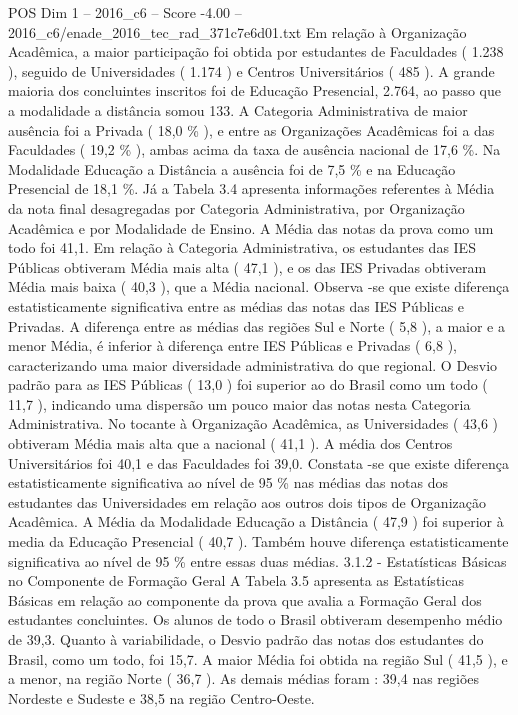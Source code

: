 \begin{textsample}{POS Dim 1 – 2016\_c6 – Score -4.00 – 2016\_c6/enade\_2016\_tec\_rad\_371c7e6d01.txt}
Em relação à Organização Acadêmica, a maior participação foi obtida por estudantes de Faculdades ( 1.238 ), seguido de Universidades ( 1.174 ) e Centros Universitários ( 485 ).
A grande maioria dos concluintes inscritos foi de Educação Presencial, 2.764, ao passo que a modalidade a distância somou 133.
A Categoria Administrativa de maior ausência foi a Privada ( 18,0 \% ), e entre as Organizações Acadêmicas foi a das Faculdades ( 19,2 \% ), ambas acima da taxa de ausência nacional de 17,6 \%.
Na Modalidade Educação a Distância a ausência foi de 7,5 \% e na Educação Presencial de 18,1 \%.
Já a Tabela 3.4 apresenta informações referentes à Média da nota final desagregadas por Categoria Administrativa, por Organização Acadêmica e por Modalidade de Ensino.
A Média das notas da prova como um todo foi 41,1.
Em relação à Categoria Administrativa, os estudantes das IES Públicas obtiveram Média mais alta ( 47,1 ), e os das IES Privadas obtiveram Média mais baixa ( 40,3 ), que a Média nacional.
Observa -se que existe diferença estatisticamente significativa entre as médias das notas das IES Públicas e Privadas.
A diferença entre as médias das regiões Sul e Norte ( 5,8 ), a maior e a menor Média, é inferior à diferença entre IES Públicas e Privadas ( 6,8 ), caracterizando uma maior diversidade administrativa do que regional.
O Desvio padrão para as IES Públicas ( 13,0 ) foi superior ao do Brasil como um todo ( 11,7 ), indicando uma dispersão um pouco maior das notas nesta Categoria Administrativa.
No tocante à Organização Acadêmica, as Universidades ( 43,6 ) obtiveram Média mais alta que a nacional ( 41,1 ).
A média dos Centros Universitários foi 40,1 e das Faculdades foi 39,0.
Constata -se que existe diferença estatisticamente significativa ao nível de 95 \% nas médias das notas dos estudantes das Universidades em relação aos outros dois tipos de Organização Acadêmica.
A Média da Modalidade Educação a Distância ( 47,9 ) foi superior à media da Educação Presencial ( 40,7 ).
Também houve diferença estatisticamente significativa ao nível de 95 \% entre essas duas médias. 3.1.2 - Estatísticas Básicas no Componente de Formação Geral A Tabela 3.5 apresenta as Estatísticas Básicas em relação ao componente da prova que avalia a Formação Geral dos estudantes concluintes.
Os alunos de todo o Brasil obtiveram desempenho médio de 39,3.
Quanto à variabilidade, o Desvio padrão das notas dos estudantes do Brasil, como um todo, foi 15,7.
A maior Média foi obtida na região Sul ( 41,5 ), e a menor, na região Norte ( 36,7 ).
As demais médias foram : 39,4 nas regiões Nordeste e Sudeste e 38,5 na região Centro-Oeste.

\end{textsample}
